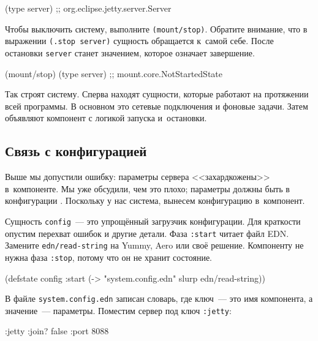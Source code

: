 \begin{english}
  \begin{clojure}
(type server)
;; org.eclipse.jetty.server.Server
  \end{clojure}
\end{english}

Чтобы выключить систему, выполните \verb|(mount/stop)|. Обратите внимание, что
в выражении \verb|(.stop server)| сущность обращается к~самой себе. После
остановки \verb|server| станет значением, которое означает завершение.

\begin{english}
  \begin{clojure}
(mount/stop)
(type server)
;; mount.core.NotStartedState
  \end{clojure}
\end{english}

Так строят систему. Сперва находят сущности, которые работают на протяжении всей
программы. В основном это сетевые подключения и фоновые задачи. Затем объявляют
компонент с логикой запуска и~остановки.

\subsection{Связь с конфигурацией}

Выше мы допустили ошибку: параметры сервера <<захардкожены>> в~компоненте. Мы
уже обсудили, чем это плохо; параметры должны быть в
конфигурации . Поскольку у нас система, вынесем конфигурацию
в~компонент.


Сущность \verb|config|~--- это упрощённый загрузчик конфигурации. Для краткости
опустим перехват ошибок и другие детали. Фаза \verb|:start| читает файл
EDN. Замените \verb|edn/read-string| на Yummy, Aero или своё
решение. Компоненту не нужна фаза \verb|:stop|, потому что он не хранит
состояние.

\begin{english}
  \begin{clojure}
(defstate config
  :start
  (-> "system.config.edn" slurp edn/read-string))
  \end{clojure}
\end{english}

В файле \verb|system.config.edn| записан словарь, где ключ~--- это имя компонента, а
значение~--- параметры. Поместим сервер под ключ \verb|:jetty|:

\begin{english}
  \begin{clojure}
{:jetty {:join? false :port 8088}}
  \end{clojure}
\end{english}

